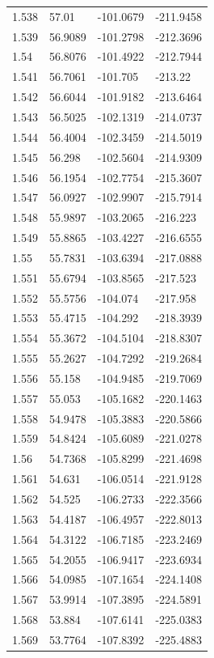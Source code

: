 \begin{tabular}{llll}
1.538 & 57.01 & -101.0679 & -211.9458 \\
1.539 & 56.9089 & -101.2798 & -212.3696 \\
1.54 & 56.8076 & -101.4922 & -212.7944 \\
1.541 & 56.7061 & -101.705 & -213.22 \\
1.542 & 56.6044 & -101.9182 & -213.6464 \\
1.543 & 56.5025 & -102.1319 & -214.0737 \\
1.544 & 56.4004 & -102.3459 & -214.5019 \\
1.545 & 56.298 & -102.5604 & -214.9309 \\
1.546 & 56.1954 & -102.7754 & -215.3607 \\
1.547 & 56.0927 & -102.9907 & -215.7914 \\
1.548 & 55.9897 & -103.2065 & -216.223 \\
1.549 & 55.8865 & -103.4227 & -216.6555 \\
1.55 & 55.7831 & -103.6394 & -217.0888 \\
1.551 & 55.6794 & -103.8565 & -217.523 \\
1.552 & 55.5756 & -104.074 & -217.958 \\
1.553 & 55.4715 & -104.292 & -218.3939 \\
1.554 & 55.3672 & -104.5104 & -218.8307 \\
1.555 & 55.2627 & -104.7292 & -219.2684 \\
1.556 & 55.158 & -104.9485 & -219.7069 \\
1.557 & 55.053 & -105.1682 & -220.1463 \\
1.558 & 54.9478 & -105.3883 & -220.5866 \\
1.559 & 54.8424 & -105.6089 & -221.0278 \\
1.56 & 54.7368 & -105.8299 & -221.4698 \\
1.561 & 54.631 & -106.0514 & -221.9128 \\
1.562 & 54.525 & -106.2733 & -222.3566 \\
1.563 & 54.4187 & -106.4957 & -222.8013 \\
1.564 & 54.3122 & -106.7185 & -223.2469 \\
1.565 & 54.2055 & -106.9417 & -223.6934 \\
1.566 & 54.0985 & -107.1654 & -224.1408 \\
1.567 & 53.9914 & -107.3895 & -224.5891 \\
1.568 & 53.884 & -107.6141 & -225.0383 \\
1.569 & 53.7764 & -107.8392 & -225.4883 \\

\end{tabular}
